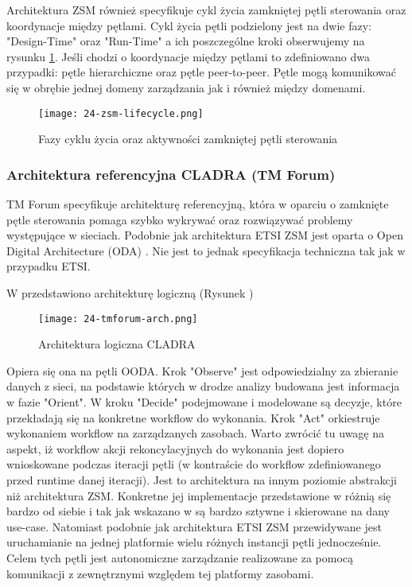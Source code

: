 Architektura ZSM również specyfikuje cykl życia zamkniętej pętli sterowania oraz koordynacje między pętlami. Cykl życia pętli podzielony jest na dwie fazy: "Design-Time" oraz "Run-Time" a ich poszczególne kroki obserwujemy na rysunku \ref{fig:24-zsm-lifecycle}. Jeśli chodzi o koordynacje między pętlami to zdefiniowano dwa przypadki: pętle hierarchiczne oraz pętle peer-to-peer. Pętle mogą komunikować się w obrębie jednej domeny zarządzania jak i również między domenami. 

\begin{figure}[!htbp]
    \centering \texttt{[image: 24-zsm-lifecycle.png]}
    \caption{Fazy cyklu życia oraz aktywności zamkniętej pętli sterowania}\label{fig:24-zsm-lifecycle}
\end{figure}




\subsubsection{Architektura referencyjna CLADRA (TM Forum)}

TM Forum specyfikuje architekturę referencyjną, która w oparciu o zamknięte pętle sterowania pomaga szybko wykrywać oraz rozwiązywać problemy występujące w sieciach. Podobnie jak architektura ETSI ZSM jest oparta o Open Digital Architecture (ODA) \cite{tmforum2018}. Nie jest to jednak specyfikacja techniczna tak jak w przypadku ETSI. 

W \cite{tmforum2021} przedstawiono architekturę logiczną (Rysunek )

\begin{figure}[!htbp]
    \centering \texttt{[image: 24-tmforum-arch.png]}
    \caption{Architektura logiczna CLADRA}\label{fig:24-tmforum-arch}
\end{figure}

Opiera się ona na pętli OODA. Krok "Observe" jest odpowiedzialny za zbieranie danych z sieci, na podstawie których w drodze analizy budowana jest informacja w fazie "Orient". W kroku "Decide" podejmowane i modelowane są decyzje, które przekładają się na konkretne workflow do wykonania. Krok "Act" orkiestruje wykonaniem workflow na zarządzanych zasobach. Warto zwrócić tu uwagę na aspekt, iż workflow akcji rekoncylacyjnych do wykonania jest dopiero wnioskowane podczas iteracji pętli (w kontraście do workflow zdefiniowanego przed runtime danej iteracji). Jest to architektura na innym poziomie abstrakcji niż architektura ZSM. Konkretne jej implementacje przedstawione w \cite{tmforum2022} różnią się bardzo od siebie i tak jak wskazano w \cite{fallon2019} są bardzo sztywne i skierowane na dany use-case. Natomiast podobnie jak architektura ETSI ZSM przewidywane jest uruchamianie na jednej platformie wielu różnych instancji pętli jednocześnie. Celem tych pętli jest autonomiczne zarządzanie realizowane za pomocą komunikacji z zewnętrznymi względem tej platformy zasobami. 

